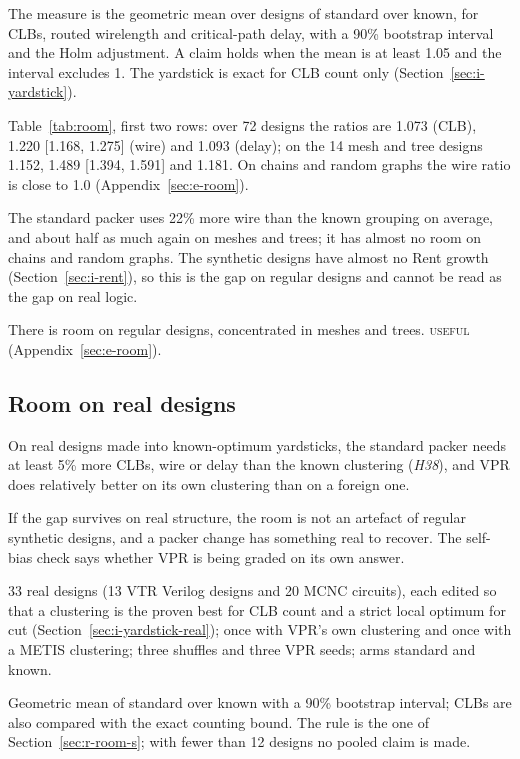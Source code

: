  The measure is the geometric mean over designs of standard over known, for CLBs, routed wirelength and critical-path delay, with a 90\% bootstrap interval and the Holm adjustment. A claim holds when the mean is at least 1.05 and the interval excludes 1. The yardstick is exact for CLB count only (Section~\ref{sec:i-yardstick}).

 Table~\ref{tab:room}, first two rows: over 72 designs the ratios are 1.073 (CLB), 1.220 [1.168, 1.275] (wire) and 1.093 (delay); on the 14 mesh and tree designs 1.152, 1.489 [1.394, 1.591] and 1.181. On chains and random graphs the wire ratio is close to 1.0 (Appendix~\ref{sec:e-room}).

 The standard packer uses 22\% more wire than the known grouping on average, and about half as much again on meshes and trees; it has almost no room on chains and random graphs. The synthetic designs have almost no Rent growth (Section~\ref{sec:i-rent}), so this is the gap on regular designs and cannot be read as the gap on real logic.

 There is room on regular designs, concentrated in meshes and trees. \textsc{useful} (Appendix~\ref{sec:e-room}).

\subsection{Room on real designs}
\label{sec:r-room-r}

 On real designs made into known-optimum yardsticks, the standard packer needs at least 5\% more CLBs, wire or delay than the known clustering (\emph{H38}), and VPR does relatively better on its own clustering than on a foreign one.

 If the gap survives on real structure, the room is not an artefact of regular synthetic designs, and a packer change has something real to recover. The self-bias check says whether VPR is being graded on its own answer.

 33 real designs (13 VTR Verilog designs and 20 MCNC circuits), each edited so that a clustering is the proven best for CLB count and a strict local optimum for cut (Section~\ref{sec:i-yardstick-real}); once with VPR's own clustering and once with a METIS clustering; three shuffles and three VPR seeds; arms standard and known.

 Geometric mean of standard over known with a 90\% bootstrap interval; CLBs are also compared with the exact counting bound. The rule is the one of Section~\ref{sec:r-room-s}; with fewer than 12 designs no pooled claim is made.

